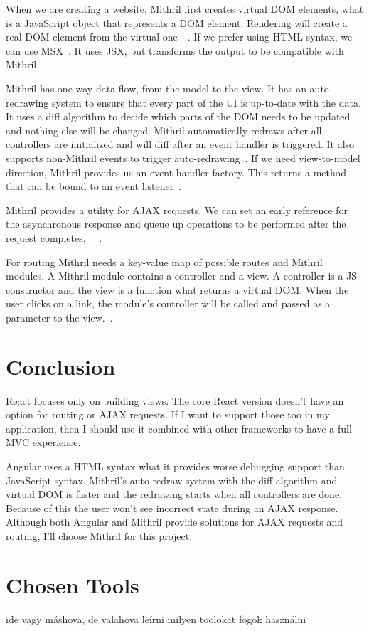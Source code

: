 When we are creating a website, Mithril first creates virtual DOM elements, what is a JavaScript object that represents a DOM element. Rendering will create a real DOM element from the virtual one~\cite{Mithril-m}~\cite{Mithril-render}. If we prefer using HTML syntax, we can use MSX~\cite{MSX}. It uses JSX, but transforms the output to be compatible with Mithril. 

Mithril has one-way data flow, from the model to the view. It has an auto-redrawing system to ensure that every part of the UI is up-to-date with the data. It uses a diff algorithm to decide which parts of the DOM needs to be updated and nothing else will be changed. Mithril automatically redraws after all controllers are initialized and will diff after an event handler is triggered. It also supports non-Mithril events to trigger auto-redrawing~\cite{Mithril-redraw}. If we need view-to-model direction, Mithril provides us an event handler factory. This returns a method that can be bound to an event listener~\cite{Mithril-withAttr}.


Mithril provides a utility for AJAX requests. We can set an early reference for the asynchronous response and queue up operations to be performed after the request completes.  ~\cite{Mithril-webservice}~\cite{Mithril-request}.


For routing Mithril needs a key-value map of possible routes and Mithril modules. A Mithril module contains a controller and a view. A controller is a JS constructor and the view is a function what returns a virtual DOM. When the user clicks on a link, the module's controller will be called and passed as a parameter to the view.~\cite{Mithril-routing}.

\section{Conclusion}

React focuses only on building views. The core React version doesn't have an option for routing or AJAX requests. If I want to support those too in my application, then I should use it combined with other frameworks to have a full MVC experience.

Angular uses a HTML syntax what it provides worse debugging support than JavaScript syntax. Mithril's auto-redraw system with the diff algorithm and virtual DOM is faster and the redrawing starts when all controllers are done. Because of this the user won't see incorrect state during an AJAX response. Although both Angular and Mithril provide solutions for AJAX requests and routing, I'll choose Mithril for this project. 


\section{Chosen Tools}
ide vagy máshova, de valahova leírni milyen toolokat fogok használni
